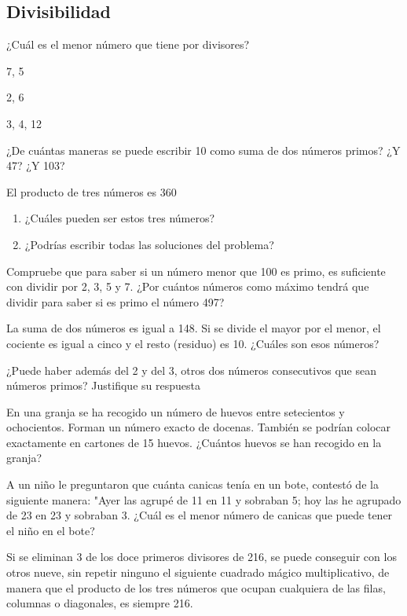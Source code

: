 \documentclass[10pt,twoside]{article}
\begin{document}
\begin{enumerate}
\section*{Divisibilidad}
\item ¿Cuál es el menor número que tiene por divisores?
\begin{enumerate}
\begin{multicols}{3}
\item 7, 5
\item 2, 6
\item 3, 4, 12
\end{multicols}
\end{enumerate}
\item ¿De cuántas maneras se puede escribir 10 como suma de dos números primos? ¿Y 47? ¿Y 103?
\item El producto de tres números es 360
\begin{enumerate}
\item ¿Cuáles pueden ser estos tres números?
\item ¿Podrías escribir todas las soluciones del problema?
\end{enumerate}
\item Compruebe que para saber si un número menor que 100 es primo, es suficiente con dividir por 2, 3, 5 y 7. ¿Por cuántos números como máximo tendrá que dividir para saber si es primo el número 497?
\item La suma de dos números es igual a 148. Si se divide el mayor por el menor, el cociente es igual a cinco y el resto (residuo) es 10. ¿Cuáles son esos números?
\item ¿Puede haber además del 2 y del 3, otros dos números consecutivos que sean números primos? Justifique su respuesta
\item En una granja se ha recogido un número de huevos entre setecientos y ochocientos. Forman un número exacto de docenas. También se podrían colocar exactamente en cartones de 15 huevos. ¿Cuántos huevos se han recogido en la granja?
\item A un niño le preguntaron que cuánta canicas tenía en un bote, contestó de la siguiente manera: "Ayer las agrupé de 11 en 11 y sobraban 5; hoy las he agrupado de 23 en 23 y sobraban 3. ¿Cuál es el menor número de canicas que puede tener el niño en el bote?
\begin{minipage}{.6\textwidth}
\item Si se eliminan 3 de los doce primeros divisores de 216, se puede conseguir con los otros nueve, sin repetir ninguno el siguiente cuadrado mágico multiplicativo, de manera que el producto de los tres números que ocupan cualquiera de las filas, columnas o diagonales, es siempre 216.
\end{minipage} \hfill
\begin{minipage}{.35\textwidth}
\end{minipage}

\end{enumerate}
\end{document}
